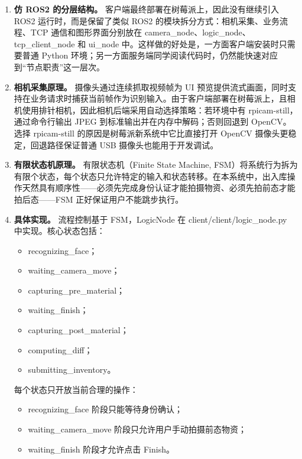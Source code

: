 \documentclass[12pt]{article}
\newcommand{\code}[1]{{\ttfamily #1}}
\begin{document}
\begin{enumerate}
	\item \textbf{仿 ROS2 的分层结构。} 客户端最终部署在树莓派上，因此没有继续引入 ROS2 运行时，而是保留了类似 ROS2 的模块拆分方式：相机采集、业务流程、TCP 通信和图形界面分别放在 \code{camera\_node}、\code{logic\_node}、\code{tcp\_client\_node} 和 \code{ui\_node} 中。这样做的好处是，一方面客户端安装时只需要普通 Python 环境；另一方面服务端同学阅读代码时，仍然能快速对应到“节点职责”这一层次。

	\item \textbf{相机采集原理。} 摄像头通过连续抓取视频帧为 UI 预览提供流式画面，同时支持在业务请求时捕获当前帧作为识别输入。由于客户端部署在树莓派上，且相机使用排针相机，因此相机后端采用自动选择策略：若环境中有 \code{rpicam-still}，通过命令行输出 JPEG 到标准输出并在内存中解码；否则回退到 OpenCV。选择 \code{rpicam-still} 的原因是树莓派新系统中它比直接打开 OpenCV 摄像头更稳定，回退路径保证普通 USB 摄像头也能用于开发调试。

	\item \textbf{有限状态机原理。} 有限状态机（Finite State Machine, FSM）将系统行为拆为有限个状态，每个状态只允许特定的输入和状态转移。在本系统中，出入库操作天然具有顺序性——必须先完成身份认证才能拍摄物资、必须先拍前态才能拍后态——FSM 正好保证用户不能跳步执行。

	\item \textbf{具体实现。} 流程控制基于 FSM，\code{LogicNode} 在 \code{client/client/logic\_node.py} 中实现。核心状态包括：

	      \begin{itemize}
		      \item \code{recognizing\_face}；
		      \item \code{waiting\_camera\_move}；
		      \item \code{capturing\_pre\_material}；
		      \item \code{waiting\_finish}；
		      \item \code{capturing\_post\_material}；
		      \item \code{computing\_diff}；
		      \item \code{submitting\_inventory}。
	      \end{itemize}

	      每个状态只开放当前合理的操作：

	      \begin{itemize}
		      \item \code{recognizing\_face} 阶段只能等待身份确认；
		      \item \code{waiting\_camera\_move} 阶段只允许用户手动拍摄前态物资；
		      \item \code{waiting\_finish} 阶段才允许点击 Finish。
	      \end{itemize}


\end{enumerate}
\end{document}
